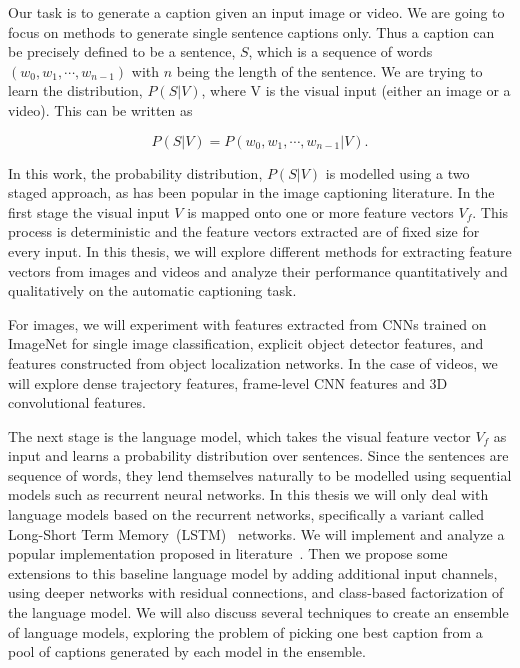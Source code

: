 Our task is to generate a caption given an input image or video. 
We are going to focus on methods to generate single sentence captions only. 
Thus a caption can be precisely defined to be a sentence, $S$, which is a
sequence of words $(w_0, w_1,\cdots, w_{n-1})$ with $n$ being the length of the
sentence. 
We are trying to learn the distribution, $P(S|V)$, where V is the visual
input (either an image or a video). 
This can be written as 

\begin{equation}
\label{eq:langB1} P(S|V) = P(w_0, w_1, \cdots, w_{n-1}|V)  .
\end{equation}

In this work, the probability distribution, $P(S|V)$ is modelled using a two
staged approach, as has been popular in the image captioning literature. 
In the first stage the visual input $V$ is mapped onto one or more feature
vectors $V_f$.
This process is deterministic and the feature vectors extracted are of fixed
size for every input. 
In this thesis, we will explore different methods for extracting feature
vectors from images and videos and analyze their performance quantitatively and
qualitatively on the automatic captioning task. 

For images, we will experiment with features extracted from CNNs trained on
ImageNet for single image classification, explicit object detector features, and
features constructed from object localization networks.
In the case of videos, we will explore dense trajectory features, frame-level
CNN features and 3D convolutional features. 

The next stage is the language model, which takes the visual feature vector
$V_f$ as input and learns a probability distribution over sentences.
Since the sentences are sequence of words, they lend themselves naturally to be
modelled using sequential models such as recurrent neural networks.
In this thesis we will only deal with language models based on the recurrent
networks, specifically a variant called Long-Short Term
Memory~(LSTM)~\cite{Hochreiter1997} networks.
We will implement and analyze a popular implementation proposed in
literature~\cite{Vinyals_2015_CVPR}.
Then we propose some extensions to this baseline language model by adding
additional input channels, using deeper networks with residual connections,
and class-based factorization of the language model. 
We will also discuss several techniques to create an ensemble of language
models, exploring the problem of picking one best caption from a pool of
captions generated by each model in the ensemble.

